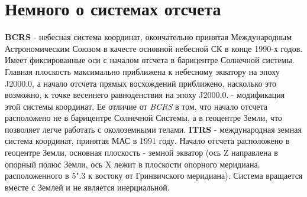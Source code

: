 \documentclass[a4paper,12pt]{report}
\begin{document}
\section*{Немного о системах отсчета}
{\bf BCRS} - небесная система координат, окончательно принятая Международным Астрономическим Союзом в качесте основной небесной СК в конце 
1990-х годов. Имеет фиксированные оси с началом отсчета в барицентре Солнечной системы. Главная плоскость максимально приближена к небесному экватору на эпоху J2000.0,
а начало отсчета прямых восхождений приближено, насколько это возможно, к точке весеннего равноденствия на эпоху J2000.0.  - модификация этой системы координат.
Ее отличие от {\it BCRS} в том, что начало отсчета расположено не в барицентре Солнечной Системы, а в геоцентре Земли, что позволяет легче работать с околоземными телами. \newline
{\bf ITRS} - международная земная система координат, принятая МАС в 1991 году. Начало отсчета расположено в геоцентре Земли, основная плоскость - земной экватор (ось Z направлена 
в опорный полюс Земли, ось X лежит в плоскости опорного меридиана, расположенного в 5".3 к востоку от Гринвичского меридиана). Система вращается вместе с Землей и не является инерциальной.
\newpage
\end{document}
